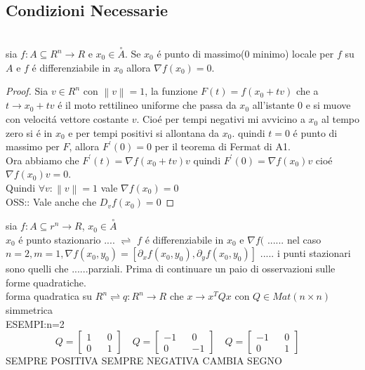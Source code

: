 \subsection{Condizioni Necessarie}
\\
sia $f:A\subseteq R^n\rightarrow R$ e $x_0\in\overset{\circ}A$. Se $x_0$ \'e punto di massimo(0 minimo) locale per $f$ su $A$ e $f$ \'e differenziabile in $x_0$ allora $\nabla f(x_0)=0$.
\begin{proof}
	Sia $v\in R^n$ con $\left\| v\right\| =1$, la funzione $F(t)= f(x_0+tv)$ che a $t\rightarrow x_0+tv$ \'e il moto rettilineo uniforme che passa da $x_0$ all'istante $0$ e si muove con velocit\'a vettore costante $v$. Cio\'e per tempi negativi mi avvicino a $x_0$ al tempo zero si \'e in $x_0$ e per tempi positivi si allontana da $x_0$. quindi $t=0$ \'e punto di massimo per $F$, allora $F^{'}(0) = 0$ per il teorema di Fermat di A1.\\
	Ora abbiamo che $F^{'}(t)=\nabla f(x_0+tv)v$ quindi $F^{'}(0)=\nabla f(x_0)v$ cio\'e $\nabla f(x_0)v=0$.\\
	Quindi $\forall v :\left\| v\right\| =1$ vale $\nabla f(x_0)=0$\\
	OSS:: Vale anche che $D_vf(x_0)=0$
\end{proof}
sia $f:A\subseteq r^n\rightarrow R$, $x_0\in\overset{\circ}{A}$\\
$x_0$ \'e punto stazionario .... $\rightleftharpoons$ $f$ \'e differenziabile in $x_0$ e $\nabla f($ ......
\observation
nel caso $n=2, m=1, \nabla f(x_0,y_0)=[\partial_xf(x_0,y_0), \partial_yf(x_0,y_0)]$ ..... i punti stazionari sono quelli che ......parziali.
\observation
Prima di continuare un paio di osservazioni sulle forme quadratiche.\\
forma quadratica su $R^n \rightleftharpoons q:R^n\rightarrow R$ che $x\rightarrow x^TQx$ con $Q\in Mat(n\times n)$ simmetrica\\
ESEMPI:n=2\\
$$
Q=\begin{bmatrix}1&&0\\0&&1\end{bmatrix}\quad
Q=\begin{bmatrix}-1&&0\\0&&-1\end{bmatrix}\quad
Q=\begin{bmatrix}-1&&0\\0&&1\end{bmatrix}\quad 
$$
SEMPRE POSITIVA SEMPRE NEGATIVA CAMBIA SEGNO\\
